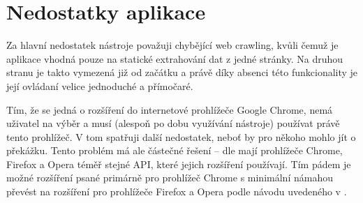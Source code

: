 \documentclass[thesis=B,czech]{FITthesis}[2012/06/26]
\begin{document}

\section{Nedostatky aplikace}
Za hlavní nedostatek nástroje považuji chybějící web crawling, kvůli čemuž je aplikace vhodná pouze na statické extrahování dat z jedné stránky. Na druhou stranu je takto vymezená již od začátku a právě díky absenci této funkcionality je její ovládaní velice jednoduché a přímočaré.

Tím, že se jedná o rozšíření do internetové prohlížeče Google Chrome, nemá uživatel na výběr a musí (alespoň po dobu využívání nástroje) používat právě tento prohlížeč. V tom spatřuji další nedostatek, neboť by pro někoho mohlo jít o překážku. Tento problém má ale částečné řešení -- dle \cite{extension_porting} mají prohlížeče Chrome, Firefox a Opera téměř stejné API, které jejich rozšíření používají. Tím pádem je možné rozšíření psané primárně pro prohlížeč Chrome s minimální námahou převést na rozšíření pro prohlížeče Firefox a Opera podle návodu uvedeného v \cite{extension_porting}.

\end{document}
